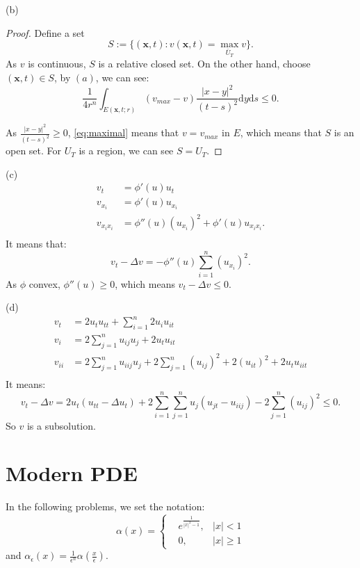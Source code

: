 \documentclass[a4paper]{ctexart}
\newcommand{\dif}{\mathrm{d}}
\newcommand{\add}[2]{\sum_{#1=1}^{#2}}
\begin{document}
(b)
\begin{proof}
Define a set 
\begin{equation}
    S:=\{(\mathbf{x},t):v(\mathbf{x},t)=\max_{\bar{U}_{T}}v\}.
\end{equation}
As $v$ is continuous, $S$ is a relative closed set. On the other hand, choose $(\mathbf{x},t)\in S$, by $(a)$, we can see:
\begin{equation}
    \label{eq:maximal}
    \frac{1}{4r^{n}}\int_{E(\mathbf{x},t;r)}(v_{max}-v)\frac{|x-y|^{2}}{(t-s)^{2}}\dif y\dif s\leqslant 0.
\end{equation}

As $\frac{|x-y|^{2}}{(t-s)^{2}}\ge 0$, \eqref{eq:maximal} means that $v=v_{max}$ in $E$, which means that $S$ is an open set. For $U_{T}$ is a region, we can see $S=U_{T}$.
\end{proof}

(c)
\begin{equation}
    \begin{aligned}
        v_{t}&=\phi'(u)u_{t}\\
        v_{x_{i}}&=\phi'(u)u_{x_{i}}\\
        v_{x_{i}x_{i}}&=\phi''(u)(u_{x_{i}})^{2}+\phi'(u)u_{x_{i}x_{i}}.\\
    \end{aligned}
\end{equation}
It means that:
\begin{equation}
    v_{t}-\Delta v=-\phi''(u)\sum_{i=1}^{n}(u_{x_{i}})^{2}.
\end{equation}
As $\phi$ convex, $\phi''(u)\ge 0$, which means $v_{t}-\Delta v\leqslant 0$.

(d)
\begin{equation}
    \begin{aligned}
        v_{t}&=2u_{t}u_{tt}+\add{i}{n}2u_{i}u_{it}\\
        v_{i}&=2\add{j}{n}u_{ij}u_{j}+2u_{t}u_{it}\\
        v_{ii}&=2\add{j}{n}u_{iij}u_{j}+2\add{j}{n}(u_{ij})^{2}+2(u_{it})^{2}+2u_{t}u_{iit}\\
    \end{aligned}
\end{equation}
It means:
\begin{equation}
    v_{t}-\Delta v=2u_{t}(u_{tt}-\Delta u_{t})+2\add{i}{n}\add{j}{n}u_{j}(u_{jt}-u_{iij})-2
    \add{j}{n}(u_{ij})^{2}\leqslant 0.
\end{equation}
So $v$ is a subsolution.
\section*{Modern PDE}
In the following problems, we set the notation:
\begin{equation}
    \alpha(x)=
    \left\{
        \begin{aligned}
           &e^{\frac{1}{|x|^{2}-1}},&|x|<1\\
           &0,&|x|\ge 1 
        \end{aligned}
    \right.
\end{equation}
and $\alpha_{\epsilon}(x)=\frac{1}{\epsilon^{n}}\alpha(\frac{x}{\epsilon})$.
\end{document}
